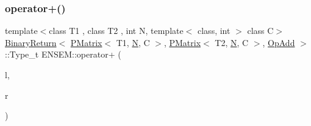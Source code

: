 \mbox{\label{group__primmatrix_ga14b22344862e687608f50a8386764f6d}} 
\subsubsection{\texorpdfstring{operator+()}{operator+()}\hspace{0.1cm}{\footnotesize\ttfamily [2/4]}}
{\footnotesize\ttfamily template$<$class T1 , class T2 , int N, template$<$ class, int $>$ class C$>$ \\
\mbox{\hyperlink{structENSEM_1_1BinaryReturn}{Binary\+Return}}$<$ \mbox{\hyperlink{classENSEM_1_1PMatrix}{P\+Matrix}}$<$ T1, \mbox{\hyperlink{adat__devel_2lib_2hadron_2operator__name__util_8cc_a7722c8ecbb62d99aee7ce68b1752f337}{N}}, C $>$, \mbox{\hyperlink{classENSEM_1_1PMatrix}{P\+Matrix}}$<$ T2, \mbox{\hyperlink{adat__devel_2lib_2hadron_2operator__name__util_8cc_a7722c8ecbb62d99aee7ce68b1752f337}{N}}, C $>$, \mbox{\hyperlink{structENSEM_1_1OpAdd}{Op\+Add}} $>$\+::Type\+\_\+t E\+N\+S\+E\+M\+::operator+ (\begin{DoxyParamCaption}\item[{const \mbox{\hyperlink{classENSEM_1_1PMatrix}{P\+Matrix}}$<$ T1, \mbox{\hyperlink{adat__devel_2lib_2hadron_2operator__name__util_8cc_a7722c8ecbb62d99aee7ce68b1752f337}{N}}, C $>$ \&}]{l,  }\item[{const \mbox{\hyperlink{classENSEM_1_1PMatrix}{P\+Matrix}}$<$ T2, \mbox{\hyperlink{adat__devel_2lib_2hadron_2operator__name__util_8cc_a7722c8ecbb62d99aee7ce68b1752f337}{N}}, C $>$ \&}]{r }\end{DoxyParamCaption})\hspace{0.3cm}{\ttfamily [inline]}}

\mbox{\label{group__primmatrix_gacd1e2ab4740e640c1aa2862faf4436db}} 
